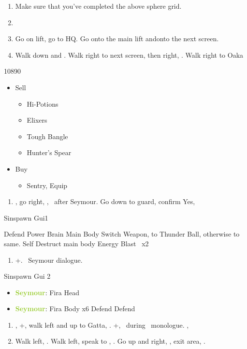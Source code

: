 \begin{enumerate}[resume]
	\item Make sure that you've completed the above sphere grid.
	\item \formation{\tidus}{\yuna}{\wakka}
	\item Go on lift, go to HQ. Go onto the main lift andonto the next screen.
	\item Walk down and \sd. Walk right to next screen, then right, \sd. Walk right to Oaka
\end{enumerate}
\begin{shop}{10890}
	\begin{itemize}
	\item Sell
	\begin{itemize}
		\item Hi-Potions
		\item Elixers
		\item Tough Bangle
		\item Hunter's Spear
	\end{itemize}
	\item Buy
	\begin{itemize}
		\item Sentry, Equip
	\end{itemize}
	\end{itemize}
\end{shop}
\begin{enumerate}[resume]
	\item \sd, go right, \cs[1:00], \sd\ after Seymour. Go down to guard, confirm Yes, \sd
\end{enumerate}
\begin{battle}[12000]{Sinspawn Gui1}
\begin{itemize}
	\tidusf Defend
	\switch{\yuna}{\auron}
	\auronf Power Brain Main Body
	\wakkaf Switch Weapon, to Thunder Ball, otherwise to same.
	\switch{\wakka}{\kimahri}
	\kimahrif Self Destruct main body
	\switch{\tidus}{\yuna}
	\summon{\valefor}
	\valeforf Energy Blast \od\ x2
\end{itemize}
\end{battle}
\begin{enumerate}[resume]
	\item \cs+\skippablefmv[2:20]. \sd\ Seymour dialogue.
\end{enumerate}
\begin{battle}[6000]{Sinspawn Gui 2}
\begin{itemize}
	\item \textbf{\textcolor{YellowGreen}{Seymour}}: Fira Head
	\item \textbf{\textcolor{YellowGreen}{Seymour}}: Fira Body x6
	\yunaf Defend
	\auronf Defend
\end{itemize}
\end{battle}
\begin{enumerate}[resume]
	\item \sd, \cs+\skippablefmv[2:00], walk left and up to Gatta, \sd. \fmv+\cs[1:30], \sd\ during \tidus\ monologue. \cs[1:00], \sd
	\item Walk left, \sd. Walk left, speak to \auron, \sd. Go up and right, \sd, exit area, \sd.
\end{enumerate}
\vfill
\ 
\columnbreak

